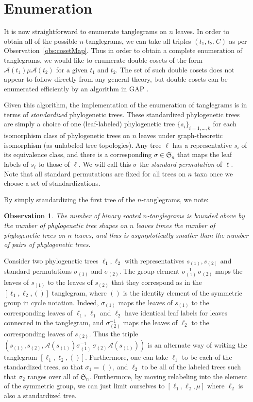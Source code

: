 \documentclass{amsart}
\newtheorem{observation}{Observation}
\newcommand{\fS}{\mathfrak S}
\newcommand{\aut}{\mathcal A}
\newcommand{\pairing}{\mu}
\newcommand{\id}{()}
\begin{document}
\section{Enumeration}
It is now straightforward to enumerate tanglegrams on $n$ leaves.
In order to obtain all of the possible $n$-tanglegrams, we can take all triples $(t_1, t_2, C)$ as per Observation~\ref{obs:cosetMap}.
Thus in order to obtain a complete enumeration of tanglegrams, we would like to enumerate double cosets of the form $\aut(t_1) \pairing \aut(t_2)$ for a given $t_1$ and $t_2$.
The set of such double cosets does not appear to follow directly from any general theory, but double cosets can be enumerated efficiently by an algorithm in GAP \cite{GAP4}.

Given this algorithm, the implementation of the enumeration of tanglegrams is in terms of \emph{standardized} phylogenetic trees.
These standardized phylogenetic trees are simply a choice of one (leaf-labeled) phylogenetic tree $\{s_i\}_{i=1,\ldots,k}$ for each isomorphism class of phylogenetic trees on $n$ leaves under graph-theoretic isomorphism (as unlabeled tree topologies).
Any tree $\ell$ has a representative $s_i$ of its equivalence class, and there is a corresponding $\sigma \in \fS_n$ that maps the leaf labels of $s_i$ to those of $\ell$.
We will call this $\sigma$ the \emph{standard permutation} of $\ell$.
Note that all standard permutations are fixed for all trees on $n$ taxa once we choose a set of standardizations.

By simply standardizing the first tree of the $n$-tanglegrams, we note:
\begin{observation}
\label{obs:count}
The number of binary rooted $n$-tanglegrams is bounded above by the number of phylogenetic tree shapes on $n$ leaves times the number of phylogenetic trees on $n$ leaves, and thus is asymptotically smaller than the number of pairs of phylogenetic trees.
\end{observation}

Consider two phylogenetic trees $\ell_1, \ell_2$ with representatives $s_{(1)}, s_{(2)}$ and standard permutations $\sigma_{(1)}$ and $\sigma_{(2)}$.
The group element $\sigma_{(1)}^{-1} \, \sigma_{(2)}$ maps the leaves of $s_{(1)}$ to the leaves of $s_{(2)}$ that they correspond as in the $[\ell_1, \ell_2, \id]$ tanglegram, where $\id$ is the identity element of the symmetric group in cycle notation.
Indeed, $\sigma_{(1)}$ maps the leaves of $s_{(1)}$ to the corresponding leaves of $\ell_1$, $\ell_1$ and $\ell_2$ have identical leaf labels for leaves connected in the tanglegram, and $\sigma_{(2)}^{-1}$ maps the leaves of $\ell_2$ to the corresponding leaves of $s_{(2)}$.
Thus the triple $(s_{(1)}, s_{(2)}, \aut(s_{(1)}) \sigma_{(1)}^{-1} \, \sigma_{(2)} \aut(s_{(1)}))$ is an alternate way of writing the tanglegram $[\ell_1, \ell_2, \id]$.
Furthermore, one can take $\ell_1$ to be each of the standardized trees, so that $\sigma_1 = \id$, and $\ell_2$ to be all of the labeled trees such that $\sigma_2$ ranges over all of $\fS_n$.
Furthermore, by moving relabeling into the element of the symmetric group, we can just limit ourselves to $[\ell_1, \ell_2, \pairing]$ where $\ell_2$ is also a standardized tree.
\end{document}
